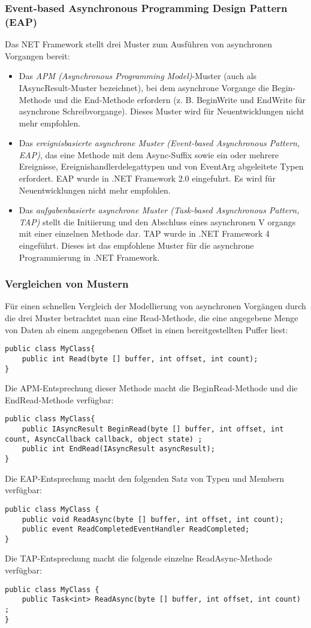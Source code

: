 \subsubsection{Event-based Asynchronous Programming Design Pattern (EAP)}
Das NET Framework stellt drei Muster zum Ausführen von
asynchronen Vorgangen bereit:
\begin{itemize}
\item Das \emph{APM (Asynchronous Programming Model)}-Muster (auch als IAsyncResult-Muster bezeichnet), bei dem asynchrone Vorgange die Begin-Methode und die End-Methode erfordern (z. B. BeginWrite und EndWrite für asynchrone Schreibvorgange). Dieses Muster wird für Neuentwicklungen nicht mehr empfohlen.
\item Das \emph{ereignisbasierte asynchrone Muster (Event-based Asynchronous Pattern, EAP)}, das eine Methode mit dem Async-Suffix sowie ein oder mehrere Ereignisse, Ereignishandlerdelegattypen und von EventArg abgeleitete Typen erfordert. EAP wurde in .NET Framework 2.0 eingefuhrt. Es wird für Neuentwicklungen nicht mehr empfohlen.
\item Das \emph{aufgabenbasierte asynchrone Muster (Task-based Asynchronous Pattern, TAP)} stellt die Initiierung und den Abschluss eines asynchronen V organgs mit einer einzelnen Methode dar. TAP wurde in .NET Framework 4 eingeführt. Dieses ist das empfohlene Muster für die asynchrone Programmierung in .NET Framework.
\end{itemize}
\subsubsection{Vergleichen von Mustern}
Für einen schnellen Vergleich der Modellierung von asynchronen Vorgängen durch die drei Muster betrachtet man eine Read-Methode, die eine angegebene Menge von Daten ab einem angegebenen Offset in einen bereitgestellten Puffer liest:
\begin{lstlisting}[language={[Sharp]C}]
public class MyClass{
	public int Read(byte [] buffer, int offset, int count);
}
\end{lstlisting}
Die APM-Entsprechung dieser Methode macht die BeginRead-Methode und die EndRead-Methode verfügbar:
\begin{lstlisting}[language={[Sharp]C}]
public class MyClass{
	public IAsyncResult BeginRead(byte [] buffer, int offset, int count, AsyncCallback callback, object state) ;
	public int EndRead(IAsyncResult asyncResult);
}
\end{lstlisting}
Die EAP-Entsprechung macht den folgenden Satz von Typen und Membern verfügbar:
\begin{lstlisting}[language={[Sharp]C}]
public class MyClass {
	public void ReadAsync(byte [] buffer, int offset, int count);
	public event ReadCompletedEventHandler ReadCompleted;
}
\end{lstlisting}
Die TAP-Entsprechung macht die folgende einzelne ReadAsync-Methode verfügbar:
\begin{lstlisting}[language={[Sharp]C}]
public class MyClass {
	public Task<int> ReadAsync(byte [] buffer, int offset, int count) ;
}
\end{lstlisting}

